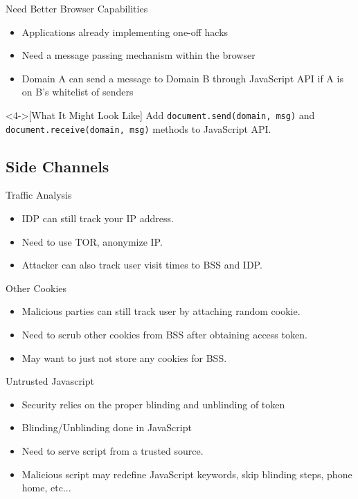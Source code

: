 \documentclass[handout]{beamer}
\begin{document}
\begin{frame}{Need Better Browser Capabilities}
  \begin{itemize}
    \item<1-> Applications already implementing one-off hacks
    \item<2-> Need a message passing mechanism within the browser
    \item<3-> Domain A can send a message to Domain B through JavaScript API if
    A is on B's whitelist of senders
  \end{itemize}

  \begin{example}<4->[What It Might Look Like]
  Add \texttt{document.send(domain, msg)} and \texttt{document.receive(domain,
  msg)} methods to JavaScript API.
  \end{example}
\end{frame}

\subsection{Side Channels}

\begin{frame}{Traffic Analysis}
  \begin{itemize}
    \item<1-> IDP can still track your IP address.
    \item<2-> Need to use TOR, anonymize IP.
    \item<3-> Attacker can also track user visit times to BSS and IDP.
  \end{itemize}
\end{frame}

\begin{frame}{Other Cookies}
  \begin{itemize}
    \item<1-> Malicious parties can still track user by attaching random cookie.
    \item<2-> Need to scrub other cookies from BSS after obtaining access token.
    \item<3-> May want to just not store any cookies for BSS.
  \end{itemize}
\end{frame}

\begin{frame}{Untrusted Javascript}
  \begin{itemize}
    \item<1-> Security relies on the proper blinding and unblinding of token
    \item<2-> Blinding/Unblinding done in JavaScript
    \item<3-> Need to serve script from a trusted source.
    \item<4-> Malicious script may redefine JavaScript keywords, skip blinding
    steps, phone home, etc...
  \end{itemize}
\end{frame}
\end{document}
